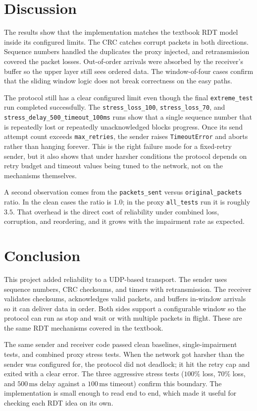 \documentclass[conference]{IEEEtran}
\begin{document}
\section{Discussion}
The results show that the implementation matches the textbook RDT model
inside its configured limits. The CRC catches corrupt packets in both
directions. Sequence numbers handled the duplicates the proxy injected,
and retransmission covered the packet losses. Out-of-order arrivals were
absorbed by the receiver's buffer so the upper layer still sees ordered
data. The window-of-four cases confirm that the sliding window logic does
not break correctness on the easy paths.

The protocol still has a clear configured limit even though the final
\texttt{extreme\_test} run completed successfully. The
\texttt{stress\_loss\_100}, \texttt{stress\_loss\_70}, and
\texttt{stress\_delay\_500\_timeout\_100ms} runs show that a single sequence
number that is repeatedly lost or repeatedly unacknowledged blocks progress.
Once its send attempt count exceeds
\texttt{max\_retries}, the sender raises \texttt{TimeoutError} and aborts
rather than hanging forever. This is the right failure mode for a fixed-retry
sender, but it also shows that under harsher conditions the protocol depends on
retry budget and timeout values being tuned to the network, not on the
mechanisms themselves.

A second observation comes from the \texttt{packets\_sent} versus
\texttt{original\_packets} ratio. In the clean cases the ratio is $1.0$; in
the proxy \texttt{all\_tests} run it is roughly $3.5$. That overhead is the
direct cost of reliability under combined loss, corruption, and reordering,
and it grows with the impairment rate as expected.

\section{Conclusion}
This project added reliability to a UDP-based transport. The sender uses
sequence numbers, CRC checksums, and timers with retransmission. The
receiver validates checksums, acknowledges valid packets, and buffers
in-window arrivals so it can deliver data in order. Both sides support a
configurable window so the protocol can run as stop and wait or with
multiple packets in flight. These are the same RDT mechanisms covered in
the textbook.

The same sender and receiver code passed clean baselines,
single-impairment tests, and combined proxy stress tests. When the network
got harsher than the sender was configured for, the protocol did not
deadlock; it hit the retry cap and exited with a clear error. The three
aggressive stress tests ($100\%$ loss, $70\%$ loss, and $500\,\text{ms}$
delay against a $100\,\text{ms}$ timeout) confirm this boundary. The
implementation is small enough to read end to end, which made it useful
for checking each RDT idea on its own.
\end{document}
